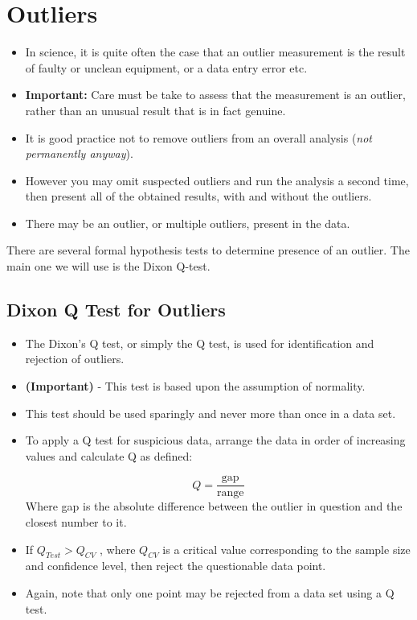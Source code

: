 \documentclass[a4paper,12pt]{article}
\begin{document}
	\newpage
	\section*{Outliers}
	
	
	\begin{itemize}
		\item In science, it is quite often the case that an outlier measurement is the result of faulty or unclean equipment, or a data entry error etc. 
		\item \textbf{Important:} Care must be take to assess that the measurement is an outlier, rather than an unusual result that is in fact genuine.
		\item It is good practice not to remove outliers from an overall analysis (\textit{not permanently anyway}). 
		\item However you may omit suspected outliers and run the analysis a second time, then present all of the obtained results, with and without the outliers.
		\item There may be an outlier, or multiple outliers, present in the data.
	\end{itemize}
	
	\noindent There are several formal hypothesis tests to determine presence of an outlier. The main one we will use is the Dixon Q-test.
	
	
	\subsection*{Dixon Q Test for Outliers}
	\begin{itemize}
		\item The Dixon's Q test, or simply the Q test, is used for identification and rejection of outliers. 
		\item \textbf{(Important)} - This test is based upon the assumption of normality. 
		\item This test should be used sparingly and never more than once in a data set. 
		\item To apply a Q test for suspicious data, arrange the data in order of increasing values and calculate Q as defined:
		
		\[ Q = \frac{\text{gap}}{\text{range}} \]
		Where gap is the absolute difference between the outlier in question and the closest number to it. 
		
		\item 	If $Q_{Test} > Q_{CV}$ , where $Q_{CV}$ is a critical value corresponding to the sample size and confidence level, then reject the questionable data point. 
		\item Again, note that only one point may be rejected from a data set using a Q test.
		
	\end{itemize}
	
\end{document}
